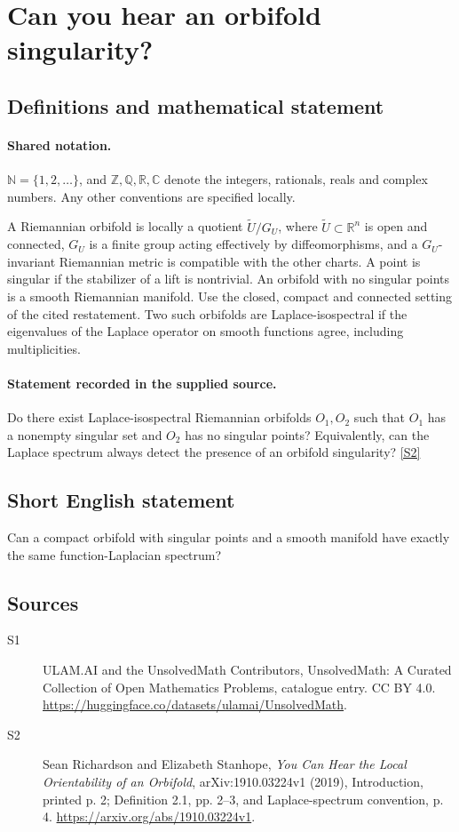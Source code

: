 \documentclass[11pt]{article}
\newcommand{\sref}[2]{\hyperlink{source:#1:#2}{[S#2]}}
\begin{document}
\section{Can you hear an orbifold singularity?}\label{statement}

\subsection{Definitions and mathematical statement}

\paragraph{Shared notation.}$\mathbb N=\{1,2,\ldots\}$, and $\mathbb Z,\mathbb Q,\mathbb R,\mathbb C$ denote the integers, rationals, reals and complex numbers. Any other conventions are specified locally.


A Riemannian orbifold is locally a quotient $\widetilde U/G_U$, where $\widetilde U\subset\mathbb R^n$ is open and connected, $G_U$ is a finite group acting effectively by diffeomorphisms, and a $G_U$-invariant Riemannian metric is compatible with the other charts. A point is singular if the stabilizer of a lift is nontrivial. An orbifold with no singular points is a smooth Riemannian manifold. Use the closed, compact and connected setting of the cited restatement. Two such orbifolds are Laplace-isospectral if the eigenvalues of the Laplace operator on smooth functions agree, including multiplicities.
\paragraph{Statement recorded in the supplied source.}
Do there exist Laplace-isospectral Riemannian orbifolds $O_1,O_2$ such that $O_1$ has a nonempty singular set and $O_2$ has no singular points? Equivalently, can the Laplace spectrum always detect the presence of an orbifold singularity? \sref{statement}{2}
\subsection{Short English statement}
Can a compact orbifold with singular points and a smooth manifold have exactly the same function-Laplacian spectrum?
\subsection{Sources}
\begin{description}
\item[\hypertarget{source:statement:1}{S1}] ULAM.AI and the UnsolvedMath Contributors, UnsolvedMath: A Curated Collection of Open Mathematics Problems, catalogue entry. CC BY 4.0. \url{https://huggingface.co/datasets/ulamai/UnsolvedMath}.
\item[\hypertarget{source:statement:2}{S2}] Sean Richardson and Elizabeth Stanhope, \emph{You Can Hear the Local Orientability of an Orbifold}, arXiv:1910.03224v1 (2019), Introduction, printed p. 2; Definition 2.1, pp. 2--3, and Laplace-spectrum convention, p. 4. \url{https://arxiv.org/abs/1910.03224v1}.
\end{description}
\label{end:statement}
\end{document}
